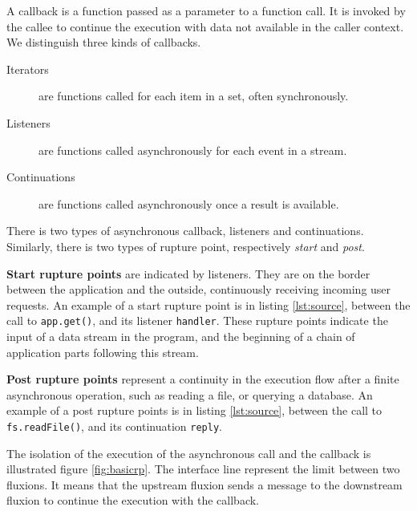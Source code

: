 A callback is a function passed as a parameter to a function call.
It is invoked by the callee to continue the execution with data not available in the caller context.
We distinguish three kinds of callbacks.

\begin{description}
  \item[Iterators] are functions called for each item in a set, often synchronously.
  \item[Listeners] are functions called asynchronously for each event in a stream.
  \item[Continuations] are functions called asynchronously once a result is available.
\end{description}

There is two types of asynchronous callback, listeners and continuations.
Similarly, there is two types of rupture point, respectively \textit{start} and \textit{post}.

\textbf{Start rupture points} are indicated by listeners. They are on the border between the application and the outside, continuously receiving incoming user requests.
An example of a start rupture point is in listing \ref{lst:source}, between the call to \texttt{app.get()}, and its listener \texttt{handler}.
These rupture points indicate the input of a data stream in the program, and the beginning of a chain of application parts following this stream.

\textbf{Post rupture points} represent a continuity in the execution flow after a finite asynchronous operation, such as reading a file, or querying a database.
An example of a post rupture points is in listing \ref{lst:source}, between the call to \texttt{fs.readFile()}, and its continuation \texttt{reply}.


The isolation of the execution of the asynchronous call and the callback is illustrated figure \ref{fig:basicrp}. The interface line represent the limit between two fluxions. It means that the upstream fluxion sends a message to the downstream fluxion to continue the execution with the callback.

